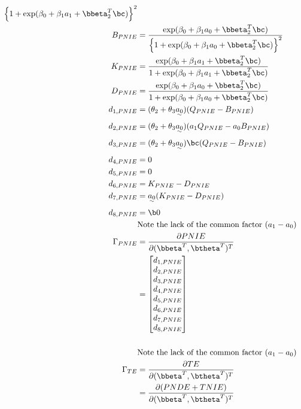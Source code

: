 \documentclass[10pt]{article}
\begin{document}
\begin{align*}
      {\left\{ 1 + \exp(\beta_{0} + \beta_{1}a_{1} + \bbeta_{2}^{T}\bc) \right\}^{2}}\\
  B_{PNIE} &= \frac
      {            \exp(\beta_{0} + \beta_{1}a_{0} + \bbeta_{2}^{T}\bc)}
      {\left\{ 1 + \exp(\beta_{0} + \beta_{1}a_{0} + \bbeta_{2}^{T}\bc) \right\}^{2}}\\
  K_{PNIE} &= \frac
      {    \exp(\beta_{0} + \beta_{1}a_{1} + \bbeta_{2}^{T}\bc)}
      {1 + \exp(\beta_{0} + \beta_{1}a_{1} + \bbeta_{2}^{T}\bc)}\\
  D_{PNIE} &= \frac
      {    \exp(\beta_{0} + \beta_{1}a_{0} + \bbeta_{2}^{T}\bc)}
      {1 + \exp(\beta_{0} + \beta_{1}a_{0} + \bbeta_{2}^{T}\bc)}\\
  d_{1,PNIE} &= (\theta_{2} + \theta_{3}\uwave{a_{0}}) (Q_{PNIE} - B_{PNIE})\\
  d_{2,PNIE} &= (\theta_{2} + \theta_{3}\uwave{a_{0}}) (a_{1}Q_{PNIE} - a_{0}B_{PNIE})\\
  d_{3,PNIE} &= (\theta_{2} + \theta_{3}\uwave{a_{0}})\bc (Q_{PNIE} - B_{PNIE})\\
  d_{4,PNIE} &= 0\\
  d_{5,PNIE} &= 0\\
  d_{6,PNIE} &= K_{PNIE} - D_{PNIE}\\
  d_{7,PNIE} &= \uwave{a_{0}} (K_{PNIE} - D_{PNIE})\\
  d_{8,PNIE} &= \b0\\
  &\text{Note the lack of the common factor }(a_{1} - a_{0})\\
  \Gamma_{PNIE}
  &= \frac{\partial PNIE}{\partial (\bbeta^{T},\btheta^{T})^{T}}\\
  &= \begin{bmatrix}
      d_{1,PNIE}\\
      d_{2,PNIE}\\
      d_{3,PNIE}\\
      d_{4,PNIE}\\
      d_{5,PNIE}\\
      d_{6,PNIE}\\
      d_{7,PNIE}\\
      d_{8,PNIE}\\
    \end{bmatrix}\\
  \\
  &\text{Note the lack of the common factor }(a_{1} - a_{0})\\
  \Gamma_{TE}
  &= \frac{\partial TE}{\partial (\bbeta^{T},\btheta^{T})^{T}}\\
  &= \frac{\partial (PNDE+TNIE)}{\partial (\bbeta^{T},\btheta^{T})^{T}}\\

\end{align*}
\end{document}
